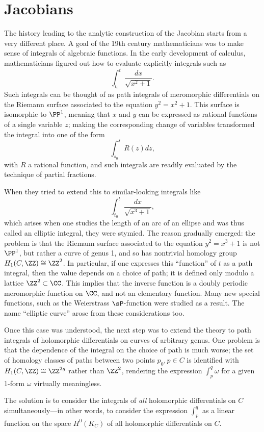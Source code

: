 \section{Jacobians}

The history leading to the analytic construction of the Jacobian starts from a very different place. A goal of the 19th century mathematicians was  to make sense of integrals of algebraic functions. In the early development of calculus, mathematicians figured out how to evaluate explicitly integrals such as
$$
\int_{t_0}^t \frac{dx}{\sqrt{x^2+1}}.
$$
Such integrals can be thought of as path integrals of meromorphic differentials on the Riemann surface associated to the equation $y^2 = x^2+1$. This surface is isomorphic to $\PP^1$, meaning that $x$ and $y$ can be expressed as rational functions of a single variable $z$; making the corresponding change of variables transformed the integral into one of the form
$$
\int_{s_0}^s R(z)dz,
$$
with $R$ a rational function, and such integrals are readily evaluated by the technique of partial fractions.

When they tried to extend this to similar-looking integrals like
$$
\int_{t_0}^t \frac{dx}{\sqrt{x^3+1}},
$$
which arises when one studies the length of an arc of an ellipse and was thus called an elliptic integral, they were stymied. The reason gradually emerged: the problem is that the Riemann surface associated to the equation $y^2 = x^3+1$ is not $\PP^1$, but rather a curve of genus 1, and so has nontrivial homology group $H_1(C, \ZZ) \cong \ZZ^2$. In particular, if one expresses this ``function'' of $t$  as a path integral, then the value depends on a choice of path; it is defined only modulo a lattice $\ZZ^2 \subset \CC$. This implies that the inverse function is a doubly periodic meromorphic function on $\CC$, and not an elementary function. Many new special functions, such as the Weierstrass $\sP$-function were studied as a result. The name ``elliptic curve'' arose from these considerations too.

Once this case was understood, the next step was to extend the theory to path integrals of holomorphic differentials on curves of arbitrary genus. One problem is that the dependence of the integral on the choice of path is much worse; the set of homology classes of paths between two points $p_0, p \in C$ is identified with $H_1(C,\ZZ) \cong \ZZ^{2g}$ rather than $\ZZ^2$, rendering the expression $\int_p^q \omega$ for a given 1-form $\omega$ virtually meaningless.

The solution is to  consider the integrals of \emph{all} holomorphic differentials on $C$ simultaneously---in other words, to consider the expression $\int_p^q$ as a linear function on the space $H^0(K_C)$ of all holomorphic differentials on $C$.

